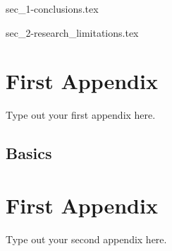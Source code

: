 \documentclass[a4paper,oneside,12pt]{report}
\begin{document}
{sec_1-conclusions.tex}

{sec_2-research_limitations.tex}

\appendix
\chapter{First Appendix}
Type out your first appendix here.
\section{Basics}

\chapter{First Appendix}
Type out your second appendix here.

\graphicspath{ {./images/} }



\end{document}

